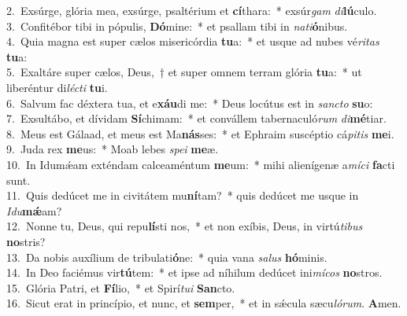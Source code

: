 {2.~}Exsúrge, glória mea, exsúrge, psaltérium et \textbf{cí}thara:~* exsúr\textit{gam} \textit{di}\textbf{lú}culo.\\
{3.~}Confitébor tibi in pópulis, \textbf{Dó}mine:~* et psallam tibi in \textit{na}\textit{ti}\textbf{ó}nibus.\\
{4.~}Quia magna est super cælos misericórdia \textbf{tu}a:~* et usque ad nubes vé\textit{ri}\textit{tas} \textbf{tu}a:\\
{5.~}Exaltáre super cælos, Deus,~† et super omnem terram glória \textbf{tu}a:~* ut liberéntur di\textit{lé}\textit{cti} \textbf{tu}i.\\
{6.~}Salvum fac déxtera tua, et e\textbf{xáu}di me:~* Deus locútus est in \textit{san}\textit{cto} \textbf{su}o:\\
{7.~}Exsultábo, et dívidam \textbf{Sí}chimam:~* et convállem tabernaculó\textit{rum} \textit{di}\textbf{mé}tiar.\\
{8.~}Meus est Gálaad, et meus est Ma\textbf{nás}ses:~* et Ephraim suscéptio cá\textit{pi}\textit{tis} \textbf{me}i.\\
{9.~}Juda rex \textbf{me}us:~* Moab lebes \textit{spe}\textit{i} \textbf{me}æ.\\
{10.~}In Idumǽam exténdam calceaméntum \textbf{me}um:~* mihi alienígenæ a\textit{mí}\textit{ci} \textbf{fa}cti sunt.\\
{11.~}Quis dedúcet me in civitátem mu\textbf{ní}tam?~* quis dedúcet me usque in \textit{I}\textit{du}\textbf{mǽ}am?\\
{12.~}Nonne tu, Deus, qui repu\textbf{lí}sti nos,~* et non exíbis, Deus, in virtú\textit{ti}\textit{bus} \textbf{no}stris?\\
{13.~}Da nobis auxílium de tribulati\textbf{ó}ne:~* quia vana \textit{sa}\textit{lus} \textbf{hó}minis.\\
{14.~}In Deo faciémus vir\textbf{tú}tem:~* et ipse ad níhilum dedúcet ini\textit{mí}\textit{cos} \textbf{no}stros.\\
{15.~}Glória Patri, et \textbf{Fí}lio,~* et Spirí\textit{tu}\textit{i} \textbf{San}cto.\\
{16.~}Sicut erat in princípio, et nunc, et \textbf{sem}per,~* et in sǽcula sæcu\textit{ló}\textit{rum}. \textbf{A}men.\\
